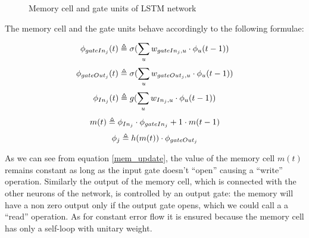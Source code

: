 \begin{figure}[h]
\caption{Memory cell and gate units of LSTM network}
\label{lstm_neuron}
\end{figure}

The memory cell and the gate units behave accordingly to the following formulae:

\begin{equation}
\phi_{gateIn_j}(t)\triangleq \sigma(\sum_u w_{gateIn_j,u}\cdot\phi_u(t-1))
\end{equation}
\begin{equation}
\phi_{gateOut_j}(t)\triangleq \sigma(\sum_u w_{gateOut_j,u}\cdot\phi_u(t-1))
\end{equation}
\begin{equation}
\phi_{In_j}(t)\triangleq g(\sum_u w_{In_j,u}\cdot\phi_u(t-1))
\end{equation}
\begin{equation}
 m(t)\triangleq \phi_{In_j}\cdot\phi_{gateIn_j}+1\cdot m(t-1)
\label{mem_update}
\end{equation}
\begin{equation}
 \phi_j\triangleq h(m(t))\cdot \phi_{gateOut_j}
\end{equation}

As we can see from equation \ref{mem_update}, the value of the memory cell $m(t)$ remains constant as long as the input 
gate doesn't ``open'' causing a ``write'' operation. Similarly the output of the memory cell, which is connected with 
the other neurons of the network, is controlled by an output gate: the memory will have a non zero output only if the 
output gate opens, which we could call a  a ``read'' operation. As for constant error flow it is ensured because the 
memory cell has only a self-loop with unitary weight.

